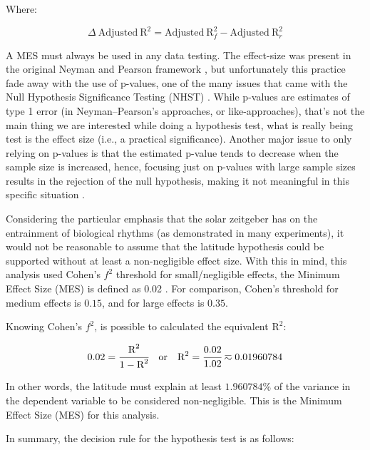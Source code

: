 \documentclass[
12pt,
openright,
oneside,
a4paper,
chapter=TITLE,
section=TITLE,
french,
spanish,
brazil,
english
]{abntex2}
\begin{document}
\medskip

Where:

\[
\Delta \ \text{Adjusted} \ \text{R}^{2} = \text{Adjusted} \ \text{R}^{2}_{f} - \text{Adjusted} \ \text{R}^{2}_{r}
\]

\medskip

A MES must always be used in any data testing. The effect-size was
present in the original Neyman and Pearson framework
\autocite{neyman1928,neyman1928a}, but unfortunately this practice fade
away with the use of p-values, one of the many issues that came with the
Null Hypothesis Significance Testing (NHST)
\autocite{perezgonzalez2015}. While p-values are estimates of type 1
error (in Neyman--Pearson's approaches, or like-approaches), that's not
the main thing we are interested while doing a hypothesis test, what is
really being test is the effect size (i.e., a practical significance).
Another major issue to only relying on p-values is that the estimated
p-value tends to decrease when the sample size is increased, hence,
focusing just on p-values with large sample sizes results in the
rejection of the null hypothesis, making it not meaningful in this
specific situation \autocite{lin2013,mariscal2021}.

Considering the particular emphasis that the solar zeitgeber has on the
entrainment of biological rhythms (as demonstrated in many experiments),
it would not be reasonable to assume that the latitude hypothesis could
be supported without at least a non-negligible effect size. With this in
mind, this analysis used Cohen's \(f^{2}\) threshold for
small/negligible effects, the Minimum Effect Size (MES) is defined as
0.02 \autocites[413]{cohen1988}[157]{cohen1992}. For comparison, Cohen's
threshold for medium effects is \(0.15\), and for large effects is
\(0.35\).

Knowing Cohen's \(f^2\), is possible to calculated the equivalent
\(\text{R}^{2}\):

\[
0.02 = \cfrac{\text{R}^{2}}{1 - \text{R}^{2}} \quad \text{or} \quad \text{R}^{2} = \cfrac{0.02}{1.02} \eqsim 0.01960784
\]

\medskip

In other words, the latitude must explain at least \(1.960784\%\) of the
variance in the dependent variable to be considered non-negligible. This
is the Minimum Effect Size (MES) for this analysis.

In summary, the decision rule for the hypothesis test is as follows:
\end{document}
